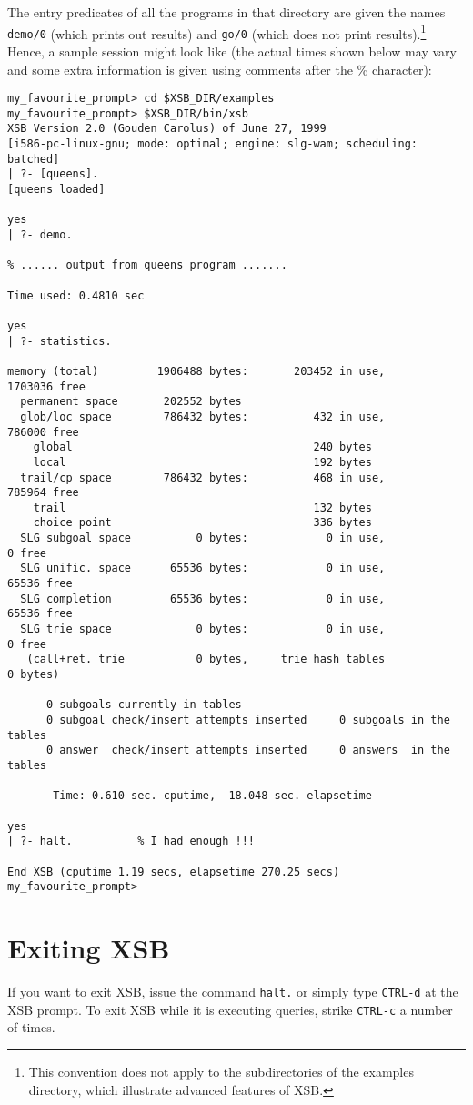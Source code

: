 The entry predicates of all the programs in that directory are given
the names {\tt demo/0} (which prints out results) and {\tt go/0}
(which does not print results).\footnote{
  This convention does not apply to the subdirectories of the examples
  directory, which illustrate advanced features of XSB.
  }
Hence, a sample session might look like
(the actual times shown below may vary and some extra information is given
using comments after the \% character):

{\footnotesize
 \begin{verbatim}
my_favourite_prompt> cd $XSB_DIR/examples
my_favourite_prompt> $XSB_DIR/bin/xsb
XSB Version 2.0 (Gouden Carolus) of June 27, 1999
[i586-pc-linux-gnu; mode: optimal; engine: slg-wam; scheduling: batched]
| ?- [queens].
[queens loaded]

yes
| ?- demo.

% ...... output from queens program .......

Time used: 0.4810 sec

yes
| ?- statistics.

memory (total)         1906488 bytes:       203452 in use,      1703036 free
  permanent space       202552 bytes
  glob/loc space        786432 bytes:          432 in use,       786000 free
    global                                     240 bytes
    local                                      192 bytes
  trail/cp space        786432 bytes:          468 in use,       785964 free
    trail                                      132 bytes
    choice point                               336 bytes
  SLG subgoal space          0 bytes:            0 in use,            0 free
  SLG unific. space      65536 bytes:            0 in use,        65536 free
  SLG completion         65536 bytes:            0 in use,        65536 free
  SLG trie space             0 bytes:            0 in use,            0 free
   (call+ret. trie           0 bytes,     trie hash tables            0 bytes)

      0 subgoals currently in tables
      0 subgoal check/insert attempts inserted     0 subgoals in the tables
      0 answer  check/insert attempts inserted     0 answers  in the tables

       Time: 0.610 sec. cputime,  18.048 sec. elapsetime

yes
| ?- halt.          % I had enough !!!

End XSB (cputime 1.19 secs, elapsetime 270.25 secs)
my_favourite_prompt>
 \end{verbatim}
}


\section{Exiting XSB}

If you want to exit XSB, issue the command \verb'halt.' or
simply type \verb'CTRL-d' at the XSB prompt. To exit XSB while it is
executing queries, strike \verb'CTRL-c' a number of times.


